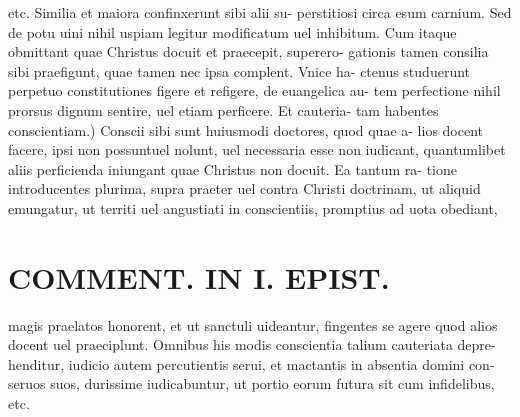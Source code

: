 \documentclass{article}
\begin{document}
\begin{pages}
etc. Similia et maiora confinxerunt sibi alii su- perstitiosi circa esum carnium. Sed de potu uini nihil uspiam legitur modificatum uel inhibitum. Cum itaque obmittant quae Christus docuit et praecepit, superero- gationis tamen consilia sibi praefigunt, quae tamen nec ipsa complent. Vnice ha- ctenus studuerunt perpetuo constitutiones figere et refigere, de euangelica au- tem perfectione nihil prorsus dignum sentire, uel etiam perficere. Et cauteria- tam habentes conscientiam.) Conscii sibi sunt huiusmodi doctores, quod quae a- lios docent facere, ipsi non possuntuel nolunt, uel necessaria esse non iudicant, quantumlibet aliis perficienda iniungant quae Christus non docuit. Ea tantum ra- tione introducentes plurima, supra praeter uel contra Christi doctrinam, ut aliquid emungatur, ut territi uel angustiati in conscientiis, promptius ad uota obediant,  \pend
\section*{COMMENT. IN I. EPIST. }
\marginpar{[ p.506 ]}\pstart magis praelatos honorent, et ut sanctuli uideantur, fingentes se agere quod alios docent uel praeciplunt. Omnibus his modis conscientia talium cauteriata depre- henditur, iudicio autem percutientis serui, et mactantis in absentia domini con- seruos suos, durissime iudicabuntur, ut portio eorum futura sit cum infidelibus, etc.  \pend
{}
{}

\end{pages}
\end{document}
